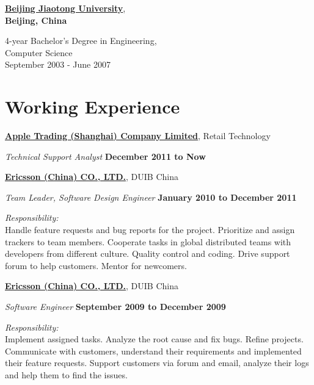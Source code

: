 \href{http://www.njtu.edu.cn/en/}{\textbf{Beijing Jiaotong University}},\\
\textbf{Beijing, China}
\begin{outerlist}
\item[] 4-year Bachelor's Degree in Engineering, \\
        {Computer Science}\\
        September 2003 - June 2007
\end{outerlist}       

%
\section{Working Experience}
\href{http://www.apple.com}{\textbf{Apple Trading (Shanghai) Company Limited}}, {Retail Technology}
\begin{outerlist}
\item[] \textit{Technical Support Analyst}%
        \hfill \textbf{December 2011 to Now}
\end{outerlist}
\blankline

\href{http://www.ericsson.com/cn}{\textbf{Ericsson (China) CO., LTD.}}, {DUIB China}
\begin{outerlist}
\item[] \textit{Team Leader, Software Design Engineer}%
        \hfill \textbf{January 2010 to December 2011}
\begin{outerlist}
\item \textit{Responsibility:}\\
Handle feature requests and bug reports for the project.
Prioritize and assign trackers to team members.
Cooperate tasks in global distributed teams with developers from different culture. Quality control and coding. Drive support forum to help customers. 
Mentor for newcomers.
\end{outerlist}
\end{outerlist}
\blankline

\href{http://www.ericsson.com/cn}{\textbf{Ericsson (China) CO., LTD.}}, {DUIB China}
\begin{outerlist}
\item[] \textit{Software Engineer}%
        \hfill \textbf{September 2009 to December 2009}
\begin{outerlist}
\item \textit{Responsibility:}\\
Implement assigned tasks. Analyze the root cause and fix bugs.
Refine projects. Communicate with customers, understand their requirements and implemented their feature requests. Support customers via forum and email, analyze their logs and help them to find the issues.
\end{outerlist}
\end{outerlist}
\blankline

